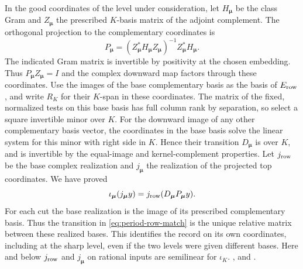 In the good coordinates of the level under consideration, let
\(H_{\boldsymbol\mu}\) be the class Gram and
\(Z_{\boldsymbol\mu}\) the prescribed \(K\)-basis matrix of the
adjoint complement. The orthogonal projection to the
complementary coordinates is
\[
 P_{\boldsymbol\mu}=
  (Z_{\boldsymbol\mu}^*H_{\boldsymbol\mu}Z_{\boldsymbol\mu})^{-1}
   Z_{\boldsymbol\mu}^*H_{\boldsymbol\mu}.
\]
The indicated Gram matrix is invertible by positivity at the
chosen embedding. Thus \(P_{\boldsymbol\mu}Z_{\boldsymbol\mu}=I\)
and the complex downward map factors through these coordinates.
Use the images of the base complementary basis as the basis of
\(E_{\rm row}\), and write \(R_K\) for their \(K\)-span in
these coordinates. The matrix of the fixed, normalized tests on
this base basis has full column rank by separation, so select a
square invertible minor over \(K\). For the downward image of
any other complementary basis vector, the coordinates in the
base basis solve the linear system for this minor with right
side in \(K\). Hence their transition \(D_{\boldsymbol\mu}\)
is over \(K\), and is invertible by the equal-image and
kernel-complement properties. Let \(j_{\rm row}\) be the base
complex realization and \(j_{\boldsymbol\mu}\) the realization
of the projected top coordinates. We have proved
\begin{equation}
\label{eq:period-row-match}
 \iota_{\boldsymbol\mu}(j_{\boldsymbol\mu}y)
      = j_{\rm row}(D_{\boldsymbol\mu}P_{\boldsymbol\mu}y).
\end{equation}
For each cut the base realization is the image of its prescribed
complementary basis. Thus the transition in
\eqref{eq:period-row-match} is the unique relative matrix between
these realized bases. This identifies the record on its own
coordinates, including at the sharp level, even if the two
levels were given different bases. Here and below \(j_{\rm row}\)
and \(j_{\boldsymbol\mu}\) on rational inputs are semilinear for
\(\iota_K\).
,  and
.


